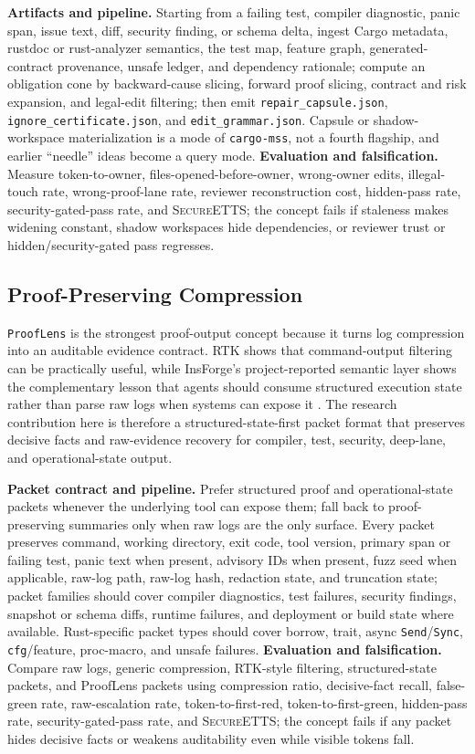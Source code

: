 \documentclass[conference]{IEEEtran}
\newcommand{\concepttag}[1]{%
  \noindent{\small\ttfamily #1}\par\vspace{2pt}%
}
\newcommand{\secureetts}{\textnormal{\textsc{SecureETTS}}}
\begin{document}
\textbf{Artifacts and pipeline.} Starting from a failing test, compiler diagnostic, panic span, issue text, diff, security finding, or schema delta, ingest Cargo metadata, rustdoc or rust-analyzer semantics, the test map, feature graph, generated-contract provenance, unsafe ledger, and dependency rationale; compute an obligation cone by backward-cause slicing, forward proof slicing, contract and risk expansion, and legal-edit filtering; then emit \texttt{repair\_capsule.json}, \texttt{ignore\_certificate.json}, and \texttt{edit\_grammar.json}. Capsule or shadow-workspace materialization is a mode of \texttt{cargo-mss}, not a fourth flagship, and earlier ``needle'' ideas become a query mode. \textbf{Evaluation and falsification.} Measure token-to-owner, files-opened-before-owner, wrong-owner edits, illegal-touch rate, wrong-proof-lane rate, reviewer reconstruction cost, hidden-pass rate, security-gated-pass rate, and \secureetts{}; the concept fails if staleness makes widening constant, shadow workspaces hide dependencies, or reviewer trust or hidden/security-gated pass regresses.

\subsection{Proof-Preserving Compression}
\label{sub:prooflens}
\concepttag{ProofLens}
\texttt{ProofLens} is the strongest proof-output concept because it turns log compression into an auditable evidence contract. RTK shows that command-output filtering can be practically useful, while InsForge's project-reported semantic layer shows the complementary lesson that agents should consume structured execution state rather than parse raw logs when systems can expose it \cite{rtk2026,insforgeRepo2026}. The research contribution here is therefore a structured-state-first packet format that preserves decisive facts and raw-evidence recovery for compiler, test, security, deep-lane, and operational-state output.

\textbf{Packet contract and pipeline.} Prefer structured proof and operational-state packets whenever the underlying tool can expose them; fall back to proof-preserving summaries only when raw logs are the only surface. Every packet preserves command, working directory, exit code, tool version, primary span or failing test, panic text when present, advisory IDs when present, fuzz seed when applicable, raw-log path, raw-log hash, redaction state, and truncation state; packet families should cover compiler diagnostics, test failures, security findings, snapshot or schema diffs, runtime failures, and deployment or build state where available. Rust-specific packet types should cover borrow, trait, async \texttt{Send}/\texttt{Sync}, \texttt{cfg}/feature, proc-macro, and unsafe failures. \textbf{Evaluation and falsification.} Compare raw logs, generic compression, RTK-style filtering, structured-state packets, and ProofLens packets using compression ratio, decisive-fact recall, false-green rate, raw-escalation rate, token-to-first-red, token-to-first-green, hidden-pass rate, security-gated-pass rate, and \secureetts{}; the concept fails if any packet hides decisive facts or weakens auditability even while visible tokens fall.
\end{document}
